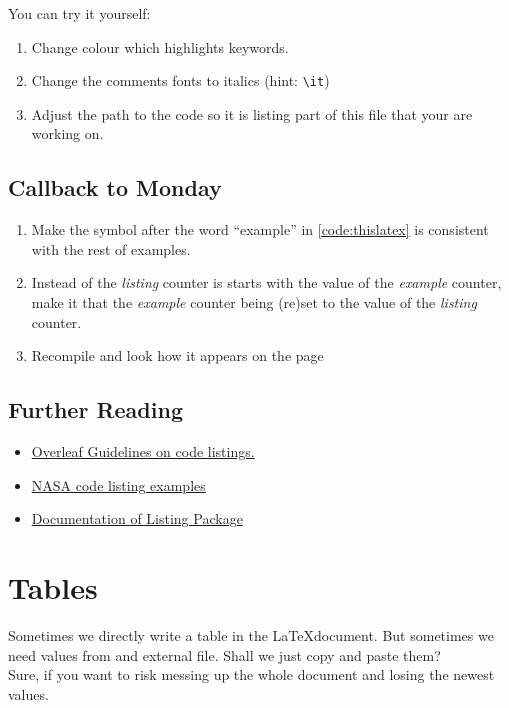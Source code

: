 \documentclass[a4paper,10pt]{report} %
\begin{document}
\noindent You can try it yourself:
\begin{enumerate}
 \item Change colour which highlights keywords. 
 \item Change the comments fonts to italics (hint: \texttt{\textbackslash it})
 \item Adjust the path to the code so it is listing part of this file that your are working on.
\end{enumerate}

\subsection{Callback to Monday}
\begin{enumerate} 
 \item Make the symbol after the word ``example'' in \ref{code:thislatex} is consistent with the rest of examples. 
 \item Instead of the \emph{listing} counter is starts with the value of the \emph{example} counter, make it that the \emph{example} counter being (re)set to the value of the \emph{listing} counter.
 \item Recompile and look how it appears on the page \pageref{listings}
\end{enumerate}

\subsection*{Further Reading}
\begin{itemize}
 \item \href{https://www.overleaf.com/learn/latex/Code_listing}{Overleaf Guidelines on code listings.}
 \item \href{https://nasa.github.io/nasa-latex-docs/html/examples/listing.html}{NASA code listing examples}
 \item \href{https://texdoc.org/serve/listings.pdf/0}{Documentation of Listing Package}
\end{itemize}


\newpage 

\section{Tables}

Sometimes we directly write a table in the \LaTeX document. But sometimes we need values from and external file. Shall we just copy and paste them?~\vspace{2ex}\\
Sure, if you want to risk messing up the whole document and losing the newest values.~\vspace{2ex}
\end{document}
